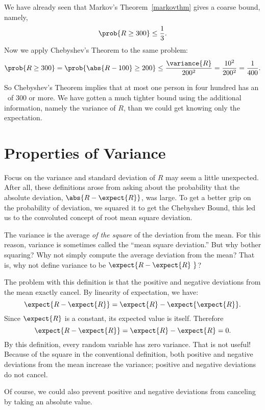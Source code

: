 We have already seen that Markov's Theorem~\ref{markovthm} gives a coarse
bound, namely,
\[
  \prob{R \geq 300} \leq \frac{1}{3}.
\]
Now we apply Chebyshev's Theorem to the same problem:
\[
\prob{R \geq 300} = \prob{\abs{R - 100} \geq 200} \leq
\frac{\variance{R}}{200^2} = \frac{10^2}{200^2} = \frac{1}{400}.
\]
\iffalse
The purpose of the first step is to express the desired probability in the
form required by Chebyshev's Theorem; the equality holds because $R$ is
nonnegative.  Chebyshev's Theorem then yields the inequality.\fi

So Chebyshev's Theorem implies that at most one person in four hundred has
an \IQ\ of 300 or more.  We have gotten a much tighter bound using the
additional information, namely the variance of $R$, than we could get
knowing only the expectation.

\section{Properties of Variance}\label{variance_sec}
Focus on the variance and standard deviation of $R$ may seem a little
unexpected.  After all, these definitions arose from asking about the
probability that the absolute deviation, $\abs{R - \expect{R}}$, was
large.  To get a better grip on the probability of deviation, we
squared it to get the Chebyshev Bound, this led us to the convoluted
concept of root mean square deviation.

\begin{editingnotes}
The variance is the average \emph{of the square} of the deviation from the
mean.  For this reason, variance is sometimes called the ``mean square
deviation.''  But why bother squaring?  Why not simply compute the average
deviation from the mean?  That is, why not define variance to be
$\expect{R - \expect{R}\ }$?

The problem with this definition is that the positive and negative
deviations from the mean exactly cancel.  By linearity of expectation,
we have:
\[
  \expect{R - \expect{R}} = \expect{R} - \expect{\expect{R}}.
\]
Since $\expect{R}$ is a constant, its expected value is itself. Therefore
\[
\expect{R - \expect{R}} = \expect{R} - \expect{R} = 0.
\]
By this definition, every random variable has zero variance.  That is not
useful!  Because of the square in the conventional definition, both
positive and negative deviations from the mean increase the variance;
positive and negative deviations do not cancel.

Of course, we could also prevent positive and negative deviations from
canceling by taking an absolute value.
\end{editingnotes}

